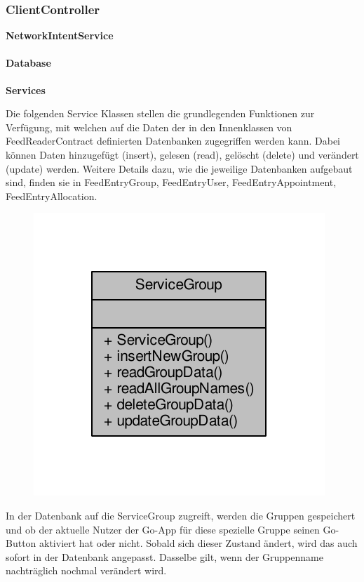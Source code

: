 \subsubsection{ClientController}

\textbf{NetworkIntentService}

\paragraph{Database}

\textbf{Services}

Die folgenden Service Klassen stellen die grundlegenden Funktionen zur Verfügung, mit welchen auf die Daten der in den Innenklassen von FeedReaderContract definierten Datenbanken zugegriffen werden kann. Dabei können Daten hinzugefügt (insert), gelesen (read), gelöscht (delete) und verändert (update) werden.
Weitere Details dazu, wie die jeweilige Datenbanken aufgebaut sind, finden sie in FeedEntryGroup, FeedEntryUser, FeedEntryAppointment, FeedEntryAllocation.

\begin{figure}[H]
	\includegraphics[scale = 1]{res/umlClasses/service_group__coll__graph.pdf}
	\centering
\end{figure}
In der Datenbank auf die ServiceGroup zugreift, werden die Gruppen gespeichert und ob der aktuelle Nutzer der Go-App für diese spezielle Gruppe seinen Go-Button aktiviert hat oder nicht. Sobald sich dieser Zustand ändert, wird das auch sofort in der Datenbank angepasst. Dasselbe gilt, wenn der Gruppenname nachträglich nochmal verändert wird.

